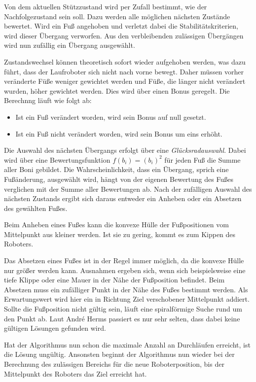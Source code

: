 Von dem aktuellen Stützzustand wird per Zufall bestimmt, wie der Nachfolgezustand sein soll. Dazu werden alle möglichen nächsten Zustände bewertet. Wird ein Fuß angehoben und verletzt dabei die Stabilitätskriterien, wird dieser Übergang verworfen. Aus den verbleibenden zulässigen Übergängen wird nun zufällig ein Übergang ausgewählt.

Zustandswechsel können theoretisch sofort wieder aufgehoben werden, was dazu führt, dass der Laufroboter sich nicht nach vorne bewegt. Daher müssen vorher veränderte Füße weniger gewichtet werden und Füße, die länger nicht verändert wurden, höher gewichtet werden. Dies wird über einen Bonus geregelt. Die Berechnng läuft wie folgt ab:

\begin{itemize}
  \item Ist ein Fuß verändert worden, wird sein Bonus auf null gesetzt.
  \item Ist ein Fuß nicht verändert worden, wird sein Bonus um eins erhöht.
\end{itemize}

Die Auswahl des nächsten Übergangs erfolgt über eine \emph{Glücksradauswahl}. Dabei wird über eine Bewertungsfunktion $f(b_i) = (b_i)^2$ für jeden Fuß die Summe aller Boni gebildet. Die Wahrscheinlichkeit, dass ein Übergang, sprich eine Fußänderung, ausgewählt wird, hängt von der eigenen Bewertung des Fußes verglichen mit der Summe aller Bewertungen ab. Nach der zufälligen Auswahl des nächsten Zustands ergibt sich daraus entweder ein Anheben oder ein Absetzen des gewählten Fußes.

Beim Anheben eines Fußes kann die konvexe Hülle der Fußpositionen vom Mittelpunkt aus kleiner werden. Ist sie zu gering, kommt es zum Kippen des Roboters.

Das Absetzen eines Fußes ist in der Regel immer möglich, da die konvexe Hülle nur größer werden kann. Ausnahmen ergeben sich, wenn sich beispielsweise eine tiefe Klippe oder eine Mauer in der Nähe der Fußposition befindet. Beim Absetzen muss ein zufälliger Punkt in der Nähe des Fußes bestimmt werden. Als Erwartungswert wird hier ein in Richtung Ziel verschobener Mittelpunkt addiert. Sollte die Fußposition nicht gültig sein, läuft eine spiralförmige Suche rund um den Punkt ab. Laut André Herms passiert es nur sehr selten, dass dabei keine gültigen Lösungen gefunden wird.

Hat der Algorithmus nun schon die maximale Anzahl an Durchläufen erreicht, ist die Lösung ungültig. Ansonsten beginnt der Algorithmus nun wieder bei der Berechnung des zulässigen Bereichs für die neue Roboterposition, bis der Mittelpunkt des Roboters das Ziel erreicht hat.

